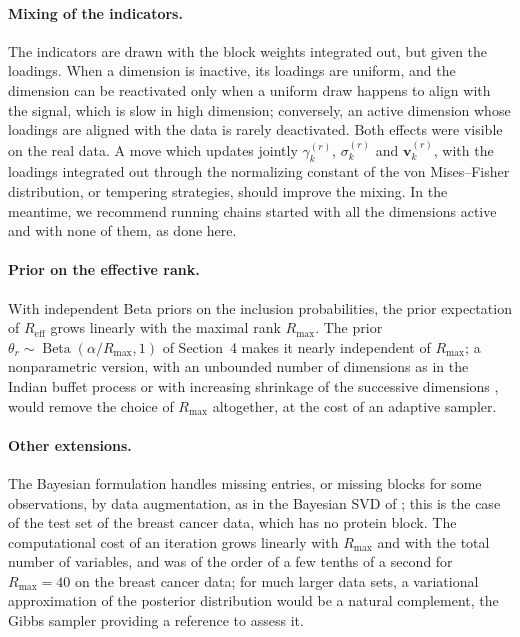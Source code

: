 \documentclass[11pt]{article}
\DeclareMathOperator{\Be}{Beta}
\newcommand{\vv}{\mathbf{v}}
\newcommand{\Reff}{R_{\mathrm{eff}}}
\begin{document}
\paragraph{Mixing of the indicators.} The indicators are drawn with the block weights integrated out, but given the loadings. When a dimension is inactive, its loadings are uniform, and the dimension can be reactivated only when a uniform draw happens to align with the signal, which is slow in high dimension; conversely, an active dimension whose loadings are aligned with the data is rarely deactivated. Both effects were visible on the real data. A move which updates jointly $\gamma_k^{(r)}$, $\sigma_k^{(r)}$ and $\vv_k^{(r)}$, with the loadings integrated out through the normalizing constant of the von Mises--Fisher distribution, or tempering strategies, should improve the mixing. In the meantime, we recommend running chains started with all the dimensions active and with none of them, as done here.
 
\paragraph{Prior on the effective rank.} With independent Beta priors on the inclusion probabilities, the prior expectation of $\Reff$ grows linearly with the maximal rank $R_{\max}$. The prior $\theta_r\sim\Be(\alpha/R_{\max},1)$ of Section~4 makes it nearly independent of $R_{\max}$; a nonparametric version, with an unbounded number of dimensions as in the Indian buffet process \citep{griffiths2011} or with increasing shrinkage of the successive dimensions \citep{bhattacharya2011,legramanti2020}, would remove the choice of $R_{\max}$ altogether, at the cost of an adaptive sampler.
 
\paragraph{Other extensions.} The Bayesian formulation handles missing entries, or missing blocks for some observations, by data augmentation, as in the Bayesian SVD of \citet{zhai2023}; this is the case of the test set of the breast cancer data, which has no protein block. The computational cost of an iteration grows linearly with $R_{\max}$ and with the total number of variables, and was of the order of a few tenths of a second for $R_{\max}=40$ on the breast cancer data; for much larger data sets, a variational approximation of the posterior distribution would be a natural complement, the Gibbs sampler providing a reference to assess it.
 
\end{document}
